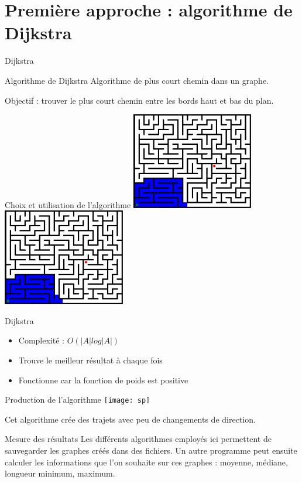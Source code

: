 \documentclass[aspectratio=43,11pt]{beamer}
\begin{document}
\section{Première approche : algorithme de Dijkstra}
\begin{frame}{Dijkstra}
    \begin{block}{Algorithme de Dijkstra}
        Algorithme de plus court chemin dans un graphe.
    \end{block}
    Objectif : trouver le plus court chemin entre les bords haut et bas du plan.
\end{frame}
\begin{frame}{Choix et utilisation de l'algorithme}
    \centering
    \includegraphics[width=0.4\textwidth]{maze1}
    \centering
    \includegraphics[width=0.4\textwidth]{maze2}
\end{frame}
\begin{frame}{Dijkstra}
    \begin{itemize}
        \item Complexité : $O(|A| log |A|)$
        \item Trouve le meilleur résultat à chaque fois
        \item Fonctionne car la fonction de poids est positive
    \end{itemize}
\end{frame}
\begin{frame}{Production de l'algorithme}
    \centering
        \texttt{[image: sp]}

    Cet algorithme crée des trajets avec peu de changements de direction.
\end{frame}
\begin{frame}{Mesure des résultats}
    Les différents algorithmes employés ici permettent de sauvegarder les graphes créés dans des fichiers.
    Un autre programme peut ensuite calculer les informations que l'on souhaite sur ces graphes : moyenne, médiane, longueur minimum, maximum.
\end{frame}
\end{document}
